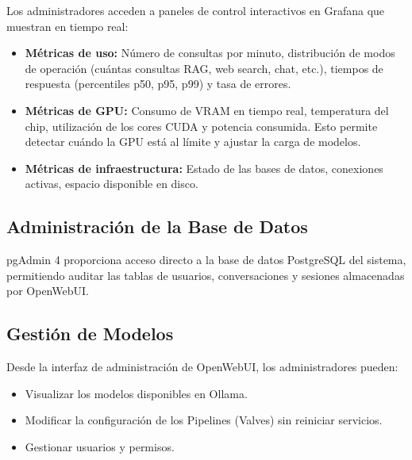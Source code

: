 Los administradores acceden a paneles de control interactivos en Grafana que muestran en tiempo real:

\begin{itemize}
    \item \textbf{Métricas de uso:} Número de consultas por minuto, distribución de modos de operación (cuántas consultas RAG, web search, chat, etc.), tiempos de respuesta (percentiles p50, p95, p99) y tasa de errores.
    \item \textbf{Métricas de GPU:} Consumo de VRAM en tiempo real, temperatura del chip, utilización de los cores CUDA y potencia consumida. Esto permite detectar cuándo la GPU está al límite y ajustar la carga de modelos.
    \item \textbf{Métricas de infraestructura:} Estado de las bases de datos, conexiones activas, espacio disponible en disco.
\end{itemize}

\subsection{Administración de la Base de Datos}

pgAdmin 4 proporciona acceso directo a la base de datos PostgreSQL del sistema, permitiendo auditar las tablas de usuarios, conversaciones y sesiones almacenadas por OpenWebUI.

\subsection{Gestión de Modelos}

Desde la interfaz de administración de OpenWebUI, los administradores pueden:
\begin{itemize}
    \item Visualizar los modelos disponibles en Ollama.
    \item Modificar la configuración de los Pipelines (Valves) sin reiniciar servicios.
    \item Gestionar usuarios y permisos.
\end{itemize}

